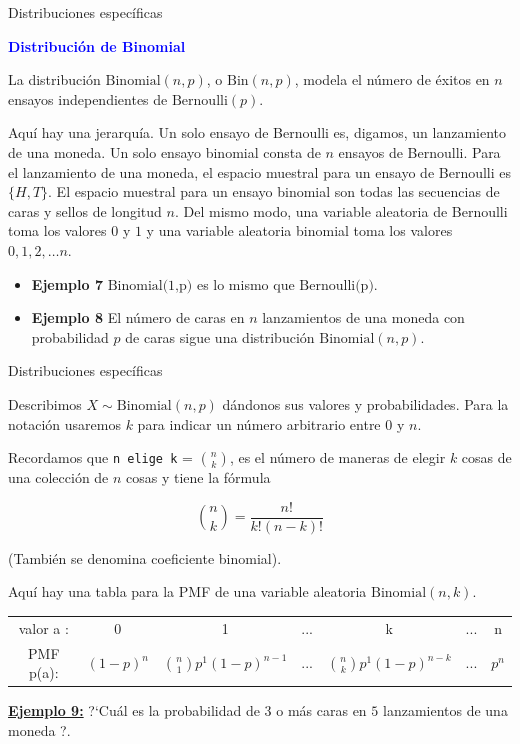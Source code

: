 \documentclass[10pt]{beamer}
\begin{document}
\begin{frame}{Distribuciones espec\'ificas}
	
\textbf{\textcolor{blue}{Distribuci\'on de Binomial}}

\small{La distribuci\'on $\text{Binomial}(n, p)$, o $\text{Bin}(n, p)$, modela el n\'umero de \'exitos en $n$ ensayos independientes de $\text{Bernoulli}(p)$.

Aqu\'i hay una jerarqu\'ia. Un solo ensayo  de Bernoulli es, digamos, un lanzamiento de una moneda. Un solo ensayo binomial consta de $n$ ensayos de Bernoulli. Para el lanzamiento  de una moneda, el espacio muestral para un ensayo de Bernoulli es $\{H, T\}$. El espacio muestral para un ensayo binomial son todas las secuencias de caras  y sellos de longitud $n$. Del mismo modo, una variable aleatoria de Bernoulli toma los valores $0$ y $1$ y una variable aleatoria binomial toma los valores $0, 1, 2,\dots n$.

\vspace{0.3cm}

\begin{itemize}
	\item \textbf{Ejemplo 7} $\text{Binomial(1,p)}$ es lo mismo que $\text{Bernoulli(p)}$.
	\item \textbf{Ejemplo 8} El n\'umero de caras  en $n$ lanzamientos de una moneda con probabilidad $p$ de caras sigue una distribuci\'on $\text{Binomial}(n, p)$.
\end{itemize}
}
\end{frame}

\begin{frame}{Distribuciones espec\'ificas}
\small{Describimos $X \sim \text{Binomial}(n, p)$ d\'andonos sus valores y probabilidades. Para la notaci\'on usaremos $k$ para indicar un n\'umero arbitrario entre $0$ y $n$.
	
Recordamos que \texttt{n elige k} = $\binom{n}{k}$, es el n\'umero de maneras de elegir $k$ cosas de una colección de $n$ cosas y tiene la f\'ormula

\[
\binom{n}{k} = \frac{n!}{k!(n - k)!}
\]

(Tambi\'en se denomina coeficiente binomial). 

\vspace{0.3cm}

Aqu\'i hay una tabla para la PMF de una variable aleatoria $\text{Binomial}(n, k)$. 

\begin{table}[]
	\centering
	\begin{tabular}{ccccccc}
		valor a : & 0          & 1 &  ... & k & ...& n \\
		PMF p(a): & $(1 -p)^n$ & $\binom{n}{1}p^1(1 -p)^{n -1}$   &...     & $\binom{n}{k}p^1(1 -p)^{n -k}$  & ...& $p^n$   
	\end{tabular}
\end{table}

\vspace{0.2cm}

\textbf{\small{\underline{Ejemplo 9:}}}
?`Cu\'al es la probabilidad de $3$ o m\'as caras en $5$ lanzamientos de una moneda ?.
}
\end{frame}
\end{document}

